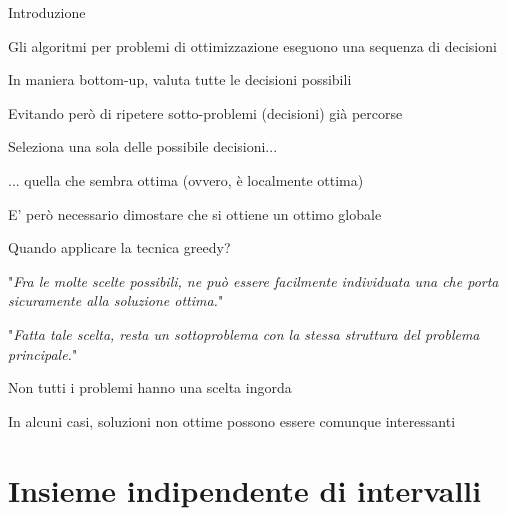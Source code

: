 \begin{frame}{Introduzione}

\BI
\item Gli algoritmi per problemi di ottimizzazione eseguono una sequenza di decisioni
\EI

\BI
\item In maniera bottom-up, valuta tutte le decisioni possibili
\item Evitando però di ripetere sotto-problemi (decisioni) già percorse
\EI

\BI
\item Seleziona una sola delle possibile decisioni...
\item ... quella che sembra ottima (ovvero, è localmente ottima)
\item E' però necessario dimostare che si ottiene un ottimo globale
\EI
\end{frame}


\begin{frame}{Quando applicare la tecnica greedy?}

"\emph{Fra le molte scelte possibili, ne può essere facilmente individuata una che porta sicuramente alla soluzione ottima.}"

\bigskip
{}
"\emph{Fatta tale scelta, resta un sottoproblema con la stessa struttura del problema principale.}"

\bigskip
{}
\BI
\item Non tutti i problemi hanno una scelta ingorda
\item In alcuni casi, soluzioni non ottime possono essere comunque interessanti
\EI
\end{frame}

\section{Insieme indipendente di intervalli}


